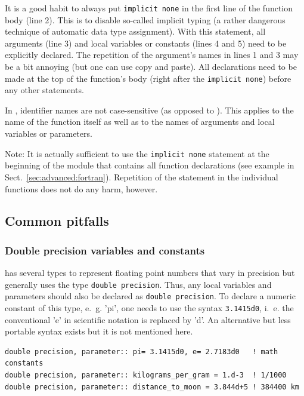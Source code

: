 \documentclass[onecolumn]{article}
\begin{document}
It is a good habit to always put \verb|implicit none| in the first line of the function body (line 2). This is to disable so-called implicit typing (a rather dangerous technique of automatic data type assignment). With this statement, all arguments (line 3) and local variables or constants (lines 4 and 5) need to be explicitly declared. The repetition of the argument's names in lines 1 and 3 may be a bit annoying (but one can use copy and paste). All declarations need to be made at the top of the function's body (right after the \verb|implicit none|) before any other statements.

In , identifier names are not case-sensitive (as opposed to ). This applies to the name of the function itself as well as to the names of arguments and local variables or parameters.

Note: It is actually sufficient to use the \verb|implicit none| statement at the beginning of the module that contains all function declarations (see example in Sect.~\ref{sec:advanced:fortran}). Repetition of the statement in the individual functions does not do any harm, however. 

\subsection{Common pitfalls}

\subsubsection{Double precision variables and constants}

 has several types to represent floating point numbers that vary in precision but  generally uses the type \verb|double precision|. Thus, any local variables and parameters should also be declared as \verb|double precision|. To declare a numeric constant of this type, e.~g. 'pi', one needs to use the syntax \verb|3.1415d0|, i.~e. the conventional 'e' in scientific notation is replaced by 'd'. An alternative but less portable syntax exists but it is not mentioned here.

\begin{shaded}
\begin{small}
\begin{verbatim}
double precision, parameter:: pi= 3.1415d0, e= 2.7183d0   ! math constants 
double precision, parameter:: kilograms_per_gram = 1.d-3  ! 1/1000
double precision, parameter:: distance_to_moon = 3.844d+5 ! 384400 km
\end{verbatim}
\end{small}
\end{shaded}
\end{document}
